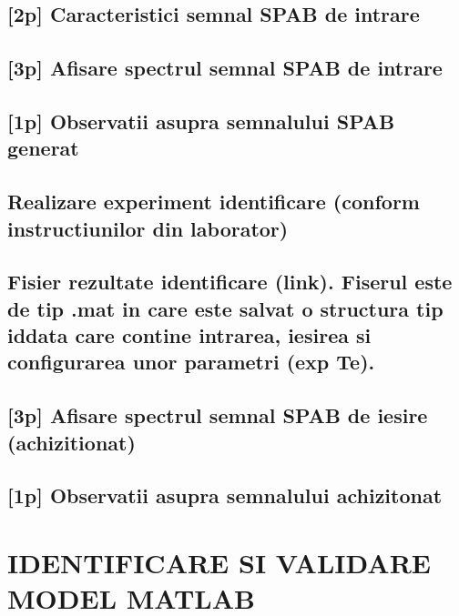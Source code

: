 \documentclass[12pt,english]{article}
\begin{document}
\subsection { [2p] Caracteristici semnal SPAB de intrare }
\subsection { [3p] Afisare spectrul semnal SPAB de intrare }
\subsection { [1p] Observatii asupra semnalului SPAB generat }
\subsection { Realizare experiment identificare (conform instructiunilor din laborator) }
\subsection { Fisier rezultate identificare (link). Fiserul este de tip .mat in care este salvat o structura tip iddata care contine intrarea, iesirea si configurarea unor parametri (exp Te). }
\subsection { [3p] Afisare spectrul semnal SPAB de iesire (achizitionat) }
\subsection { [1p] Observatii asupra semnalului achizitonat }

\section { IDENTIFICARE SI VALIDARE MODEL MATLAB }
\end{document}
